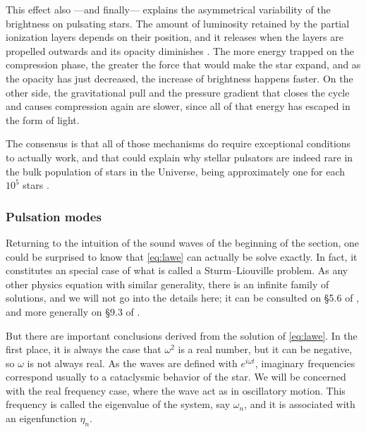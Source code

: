 	This effect also ---and finally--- explains the asymmetrical variability of the brightness on pulsating stars.
	The amount of luminosity retained by the partial ionization layers depends on their position,
	and it releases when the layers are propelled outwards and its opacity diminishes \citep{Carroll2017}.
	The more energy trapped on the compression phase, the greater the force that would make the star expand,
	and as the opacity has just decreased, the increase of brightness happens faster.
	On the other side, the gravitational pull and the pressure gradient that closes the cycle and causes compression again
	are slower, since all of that energy has escaped in the form of light. 
	
	
	
	The consensus is that all of those mechanisms do require exceptional conditions to actually work, 
	and that could explain why stellar pulsators are indeed rare in the bulk population of stars in the Universe,
	being approximately one for each $10^5$ stars \citep{Carroll2017}.
	
	\subsubsection{Pulsation modes}
	
	
	Returning to the intuition of the sound waves of the beginning of the section,
	one could be surprised to know that \autoref{eq:lawe} can actually be solve exactly.
	In fact, it constitutes an special case of what is called a Sturm–Liouville problem.
	As any other physics equation with similar generality, there is an infinite family of solutions,
	and we will not go into the details here; it can be consulted on \S 5.6 of \cite{Catelan2015},
	and more generally on \S  9.3 of \cite{Butkov1968}.
	
	But there are important conclusions derived from the solution of \autoref{eq:lawe}.
	In the first place, it is always the case that $\omega^2$ is a real number, but it can be negative, so $\omega$ is not always real.
	As the waves are defined with $e^{i \omega t}$, imaginary frequencies correspond usually to a cataclysmic behavior of the star.
	We will be concerned with the real frequency case, where the wave act as in oscillatory motion.
	This frequency is called the eigenvalue of the system, say $\omega_n$, and it is associated with an eigenfunction $\eta_n$.
	
